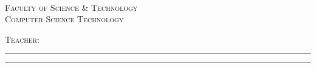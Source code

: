 %
\noindent %
%
\begin{minipage}{.40\textwidth}
    {\color{darkred} \faSchool} { \textsc{\college}}{ } {\color{darkred} \faSchool}\\ 
    \small\textsc{ Faculty of Science \& Technology}\\%
    \small\textsc{Computer Science Technology}
\end{minipage}%
\hfill	
\begin{minipage}{0.60\textwidth}%
    \raggedleft%
    {\Large \textsc{\coursenumber { } \coursetitle}\par}
    \doublerule %
    \textsc{Teacher}: \instructor\\
\end{minipage}%
\vspace{2.8cm}
{
    \hrule\vspace{.2cm}
    \centering
    {\scshape 
        \Large \color{darkestblue}{\doctitle}{ }\textemdash{ }\small\bfseries\textsc{\semester}\par}
    \vspace{.3cm}    
}
{
    \hrule\vspace{.3cm}
    \centering  \small\duedate \\ 

}    
\vspace{3.5cm}
